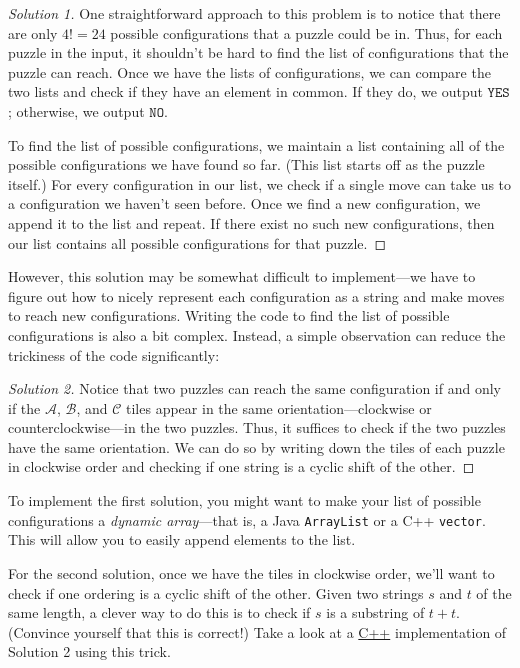 \begin{proof}[Solution 1]
  One straightforward approach to this problem is to notice that there are only $4! = 24$ possible  configurations that a puzzle could be in. Thus, for each puzzle in the input, it shouldn't be hard to find the list of configurations that the puzzle can reach. Once we have the lists of configurations, we can compare the two lists and check if they have an element in common. If they do, we output $\mathtt{YES}$; otherwise, we output $\mathtt{NO}$.

  To find the list of possible configurations, we maintain a list containing all of the possible configurations we have found so far. (This list starts off as the puzzle itself.) For every configuration in our list, we check if a single move can take us to a configuration we haven't seen before. Once we find a new configuration, we append it to the list and repeat. If there exist no such new configurations, then our list contains all possible configurations for that puzzle.
\end{proof}

However, this solution may be somewhat difficult to implement---we have to figure out how to nicely represent each configuration as a string and make moves to reach new configurations. Writing the code to find the list of possible configurations is also a bit complex. Instead, a simple observation can reduce the trickiness of the code significantly:

\begin{proof}[Solution 2]
  Notice that two puzzles can reach the same configuration if and only if the $\mathcal A$, $\mathcal B$, and $\mathcal C$ tiles appear in the same orientation---clockwise or counterclockwise---in the two puzzles. Thus, it suffices to check if the two puzzles have the same orientation. We can do so by writing down the tiles of each puzzle in clockwise order and checking if one string is a cyclic shift of the other.
\end{proof}

To implement the first solution, you might want to make your list of possible configurations a \emph{dynamic array}---that is, a Java \texttt{ArrayList} or a C++ \texttt{vector}. This will allow you to easily append elements to the list.

For the second solution, once we have the tiles in clockwise order, we'll want to check if one ordering is a cyclic shift of the other. Given two strings $s$ and $t$ of the same length, a clever way to do this is to check if $s$ is a substring of $t+t$. (Convince yourself that this is correct!) Take a look at a \href{http://codeforces.com/contest/645/submission/16801722}{C++} implementation of Solution 2 using this trick.

